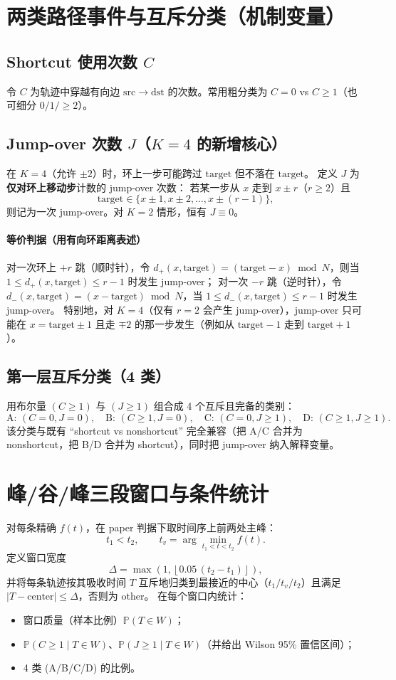\documentclass[11pt,fontset=fandol]{ctexart}
\begin{document}
\section{两类路径事件与互斥分类（机制变量）}
\subsection{Shortcut 使用次数 $C$}
令 $C$ 为轨迹中穿越有向边 $\mathrm{src}\to\mathrm{dst}$ 的次数。常用粗分类为 $C=0$ vs $C\ge1$（也可细分 $0/1/\ge2$）。

\subsection{Jump-over 次数 $J$（$K=4$ 的新增核心）}
在 $K=4$（允许 $\pm2$）时，环上一步可能跨过 $\mathrm{target}$ 但不落在 $\mathrm{target}$。
定义 $J$ 为\textbf{仅对环上移动步}计数的 jump-over 次数：
若某一步从 $x$ 走到 $x\pm r$（$r\ge2$）且
\[
\mathrm{target}\in\{x\pm1,x\pm2,\dots,x\pm(r-1)\},
\]
则记为一次 jump-over。对 $K=2$ 情形，恒有 $J\equiv0$。

\paragraph{等价判据（用有向环距离表述）}
对一次环上 $+r$ 跳（顺时针），令
$d_+(x,\mathrm{target})=(\mathrm{target}-x)\bmod N$，则当 $1\le d_+(x,\mathrm{target})\le r-1$ 时发生 jump-over；
对一次 $-r$ 跳（逆时针），令
$d_-(x,\mathrm{target})=(x-\mathrm{target})\bmod N$，当 $1\le d_-(x,\mathrm{target})\le r-1$ 时发生 jump-over。
特别地，对 $K=4$（仅有 $r=2$ 会产生 jump-over），jump-over 只可能在 $x=\mathrm{target}\pm1$ 且走 $\mp2$ 的那一步发生（例如从 $\mathrm{target}-1$ 走到 $\mathrm{target}+1$）。

\subsection{第一层互斥分类（4 类）}
用布尔量 $(C\ge1)$ 与 $(J\ge1)$ 组合成 4 个互斥且完备的类别：
\[
\text{A: }(C=0,J=0),\quad
\text{B: }(C\ge1,J=0),\quad
\text{C: }(C=0,J\ge1),\quad
\text{D: }(C\ge1,J\ge1).
\]
该分类与既有 ``shortcut vs nonshortcut'' 完全兼容（把 A/C 合并为 nonshortcut，把 B/D 合并为 shortcut），同时把 jump-over 纳入解释变量。

\section{峰/谷/峰三段窗口与条件统计}
对每条精确 $f(t)$，在 paper 判据下取时间序上前两处主峰：
\[
t_1<t_2,\qquad
t_v=\arg\min_{t_1<t<t_2}f(t).
\]
定义窗口宽度
\[
\Delta=\max\left(1,\left\lfloor 0.05\,(t_2-t_1)\right\rfloor\right),
\]
并将每条轨迹按其吸收时间 $T$ 互斥地归类到最接近的中心（$t_1/t_v/t_2$）且满足 $|T-\text{center}|\le \Delta$，否则为 other。
在每个窗口内统计：
\begin{itemize}
  \item 窗口质量（样本比例）$\mathbb{P}(T\in W)$；
  \item $\mathbb{P}(C\ge1\mid T\in W)$、$\mathbb{P}(J\ge1\mid T\in W)$（并给出 Wilson 95\% 置信区间）；
  \item 4 类 (A/B/C/D) 的比例。
\end{itemize}
\end{document}
